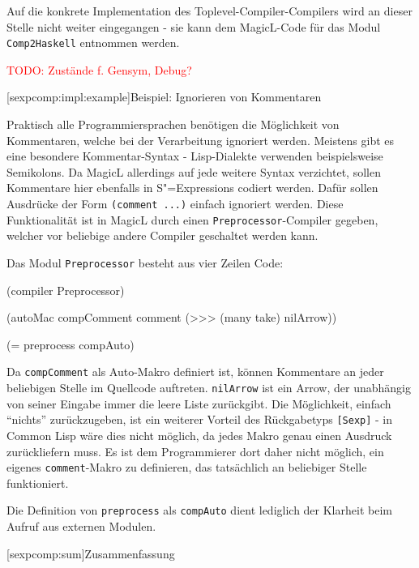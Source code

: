 \documentclass[11pt, a4paper, bibgerm]{scrbook}
\newcommand\icode[1]{\lstinline?#1?}
\newcommand{\todo}[1]{
  \textcolor{red}{TODO: #1}
}
\newcommand\lsection{}
\newcommand\lsubsection{}
\newcommand{\sexps}{S"=Expressions}
\begin{document}
Auf die konkrete Implementation des Toplevel-Compiler-Compilers wird an
dieser Stelle nicht weiter eingegangen - sie kann dem MagicL-Code
für das Modul \icode{Comp2Haskell} entnommen werden.

\todo{Zustände f. Gensym, Debug?}

\lsubsection[sexpcomp:impl:example]{Beispiel: Ignorieren von Kommentaren}

Praktisch alle Programmiersprachen benötigen die Möglichkeit von
Kommentaren, welche bei der Verarbeitung ignoriert werden. Meistens gibt
es eine besondere Kommentar-Syntax - Lisp-Dialekte verwenden
beispielsweise Semikolons. Da MagicL allerdings auf jede weitere Syntax
verzichtet, sollen Kommentare hier ebenfalls in \sexps{} codiert
werden. Dafür sollen Ausdrücke der Form \icode{(comment ...)} einfach
ignoriert werden. Diese Funktionalität ist in MagicL durch einen
\icode{Preprocessor}-Compiler gegeben, welcher vor beliebige andere
Compiler geschaltet werden kann.

Das Modul \icode{Preprocessor} besteht aus vier Zeilen Code:
\begin{code}
(compiler Preprocessor)

(autoMac compComment comment
         (>>> (many take) nilArrow))

(= preprocess compAuto)  
\end{code}
Da \icode{compComment} als Auto-Makro definiert ist, können Kommentare
an jeder beliebigen Stelle im Quellcode auftreten. \icode{nilArrow} ist
ein Arrow, der unabhängig von seiner Eingabe immer die leere Liste
zurückgibt. Die Möglichkeit, einfach ``nichts'' zurückzugeben, ist ein
weiterer Vorteil des Rückgabetyps \icode{[Sexp]} - in Common Lisp wäre
dies nicht möglich, da jedes Makro genau einen Ausdruck zurückliefern
muss. Es ist dem Programmierer dort daher nicht möglich, ein eigenes
\icode{comment}-Makro zu definieren, das tatsächlich an beliebiger
Stelle funktioniert.

Die Definition von \icode{preprocess} als \icode{compAuto} dient
lediglich der Klarheit beim Aufruf aus externen Modulen.

\lsection[sexpcomp:sum]{Zusammenfassung}
\end{document}
